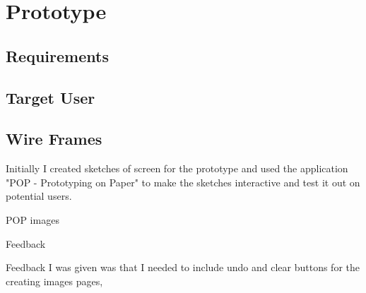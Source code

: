 \documentclass[11pt]{article}
\begin{document}
\newpage
\section{Prototype}

    \subsection{Requirements}

        \paragraph{}

    \subsection{Target User}
    
            \paragraph{}
            

    \subsection{Wire Frames}
    Initially I created sketches of screen for the prototype and used the application "POP - Prototyping on Paper" to make the sketches interactive and test it out on potential users. %
    
        POP images

    Feedback
    
    Feedback I was given was that I needed to include undo and clear buttons for the creating images pages, 
    
\end{document}
